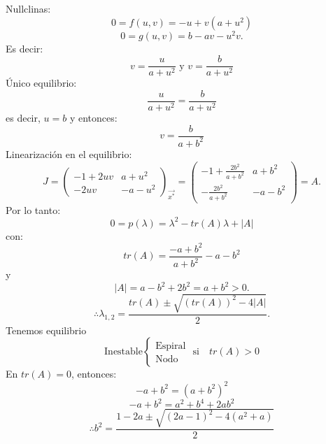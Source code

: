 \begin{enumerate}
	      Nullclinas:
	      $$0=f(u,v)=-u+v(a+u^2)$$
	      $$0=g(u,v)=b-av-u^2v.$$
	      Es decir:
	      \[
		      v=\frac{u}{a+u^2} \text{ y }
		      v=\frac{b}{a+u^2}
	      \]
	      Único equilibrio:
	      $$\frac{u}{a+u^2}=\frac{b}{a+u^2}$$
	      es decir, $u=b$ y entonces:
	      $$v=\frac{b}{a+b^2}$$
	      Linearización en el equilibrio:
	      \[
		      J=
		      \begin{pmatrix}
			      -1+2uv & a+u^2  \\
			      -2uv   & -a-u^2
		      \end{pmatrix}_{\vec{x^*}}
		      =
		      \begin{pmatrix}
			      -1+\frac{2b^2}{a+b^2} & a+b^2  \\
			      -\frac{2b^2}{a+b^2}   & -a-b^2
		      \end{pmatrix}
		      = A.
	      \]
	      Por lo tanto:
	      $$0=p(\lambda)=\lambda^2-tr(A)\lambda+|A|$$
	      con:
	      $$tr(A)=\frac{-a+b^2}{a+b^2}-a-b^2$$
	      y
	      $$|A|=a-b^2+2b^2=a+b^2>0.$$
	      $$\therefore \lambda_{1,2}=\frac{tr(A)\pm\sqrt{(tr(A))^2-4|A|}}{2}.$$
	      Tenemos equilibrio
	      \[
		      \text{Inestable}
		      \left\{ \begin{array}{lcc}
			      \text{Espiral} \\
			      \text{Nodo}
		      \end{array}
		      \right.
		      \text{ si }
		      \text{ }
		      tr(A)>0
	      \]
	      En $tr(A)=0$, entonces:
	      $$-a+b^2=(a+b^2)^2$$
	      $$-a+b^2=a^2+b^4+2ab^2$$
	      $$\therefore b^2=\frac{1-2a\pm\sqrt{(2a-1)^2-4(a^2+a)}}{2}$$
\end{enumerate}
